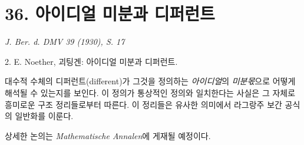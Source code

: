 \documentclass[11pt]{article}
\begin{document}
\section*{36. 아이디얼 미분과 디퍼런트}

\begin{center}
\emph{J. Ber. d. DMV 39 (1930), S. 17}
\end{center}

2. E. Noether, 괴팅겐: 아이디얼 미분과 디퍼런트.

대수적 수체의 디퍼런트(different)가 그것을 정의하는 \emph{아이디얼}의 \emph{미분몫}으로 어떻게 해석될 수 있는지를 보인다. 이 정의가 통상적인 정의와 일치한다는 사실은 그 자체로 흥미로운 구조 정리들로부터 따른다. 이 정리들은 유사한 의미에서 라그랑주 보간 공식의 일반화를 이룬다.

상세한 논의는 \emph{Mathematische Annalen}에 게재될 예정이다.
\end{document}
